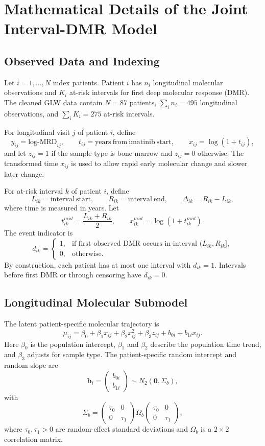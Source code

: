 \section{Mathematical Details of the Joint Interval-DMR Model}
\label{sec:joint_interval_math}

\subsection{Observed Data and Indexing}

Let \(i=1,\ldots,N\) index patients. Patient \(i\) has \(n_i\) longitudinal molecular observations and \(K_i\) at-risk intervals for first deep molecular response (DMR). The cleaned GLW data contain \(N=87\) patients, \(\sum_i n_i=495\) longitudinal observations, and \(\sum_i K_i=275\) at-risk intervals.

For longitudinal visit \(j\) of patient \(i\), define
\[
y_{ij}=\mathrm{log\mbox{-}MRD}_{ij}, \qquad
t_{ij}=\mathrm{years\ from\ imatinib\ start}, \qquad
x_{ij}=\log(1+t_{ij}),
\]
and let \(z_{ij}=1\) if the sample type is bone marrow and \(z_{ij}=0\) otherwise. The transformed time \(x_{ij}\) is used to allow rapid early molecular change and slower later change.

For at-risk interval \(k\) of patient \(i\), define
\[
L_{ik}=\mathrm{interval\ start}, \qquad
R_{ik}=\mathrm{interval\ end}, \qquad
\Delta_{ik}=R_{ik}-L_{ik},
\]
where time is measured in years. Let
\[
t^{mid}_{ik}=\frac{L_{ik}+R_{ik}}{2}, \qquad
x^{mid}_{ik}=\log(1+t^{mid}_{ik}).
\]
The event indicator is
\[
d_{ik} =
\begin{cases}
1, & \text{if first observed DMR occurs in interval }(L_{ik},R_{ik}],\\
0, & \text{otherwise.}
\end{cases}
\]
By construction, each patient has at most one interval with \(d_{ik}=1\). Intervals before first DMR or through censoring have \(d_{ik}=0\).

\subsection{Longitudinal Molecular Submodel}

The latent patient-specific molecular trajectory is
\[
\mu_{ij}
=\beta_0+\beta_1x_{ij}+\beta_2x_{ij}^2+\beta_3z_{ij}
+b_{0i}+b_{1i}x_{ij}.
\]
Here \(\beta_0\) is the population intercept, \(\beta_1\) and \(\beta_2\) describe the population time trend, and \(\beta_3\) adjusts for sample type. The patient-specific random intercept and random slope are
\[
\mathbf{b}_i =
\begin{pmatrix}
b_{0i}\\
b_{1i}
\end{pmatrix}
\sim N_2(\mathbf{0},\Sigma_b),
\]
with
\[
\Sigma_b =
\begin{pmatrix}
\tau_0 & 0\\
0 & \tau_1
\end{pmatrix}
\Omega_b
\begin{pmatrix}
\tau_0 & 0\\
0 & \tau_1
\end{pmatrix},
\]
where \(\tau_0,\tau_1>0\) are random-effect standard deviations and \(\Omega_b\) is a \(2\times2\) correlation matrix.

